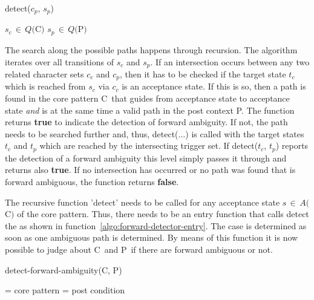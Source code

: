 \documentclass[acmtoplas]{acmtrans2m}
\newcommand{\funcref}[1]{function~\ref{algo:#1}}
\newcommand{\pP}{{\sf P}}
\newcommand{\pC}{{\sf C}}
\begin{document}
\begin{algorithm}
\caption{detect($c_p$, $s_p$)}
\label{algo:forward-detector}
\begin{algorithmic}
    \REQUIRE $s_c\,\in\,Q($\pC$)$
    \REQUIRE $s_p\,\in\,Q($\pP$)$
    
                \IF{ $t_c \,\in\,A($\pC$)$}
                    \RETURN \TRUE
                    \RETURN \TRUE
                \ENDIF
            \ENDIF
        \ENDFOR
    \ENDFOR
    \RETURN \FALSE
\end{algorithmic}
\end{algorithm}

The search along the possible paths happens through recursion.  The algorithm
    iterates over all transitions of $s_c$ and $s_p$.
    If an intersection occurs between any two related character sets $c_c$ and $c_p$, then it has to be
    checked if the target state $t_c$ which is reached from $s_c$ via $c_c$ is an acceptance
    state. If this is so, then a path is found in the core pattern \pC\ that guides from 
    acceptance state to acceptance state {\it and} is at the same time a valid
    path in the post context \pP. The function returns {\bf true} to indicate the
    detection of forward ambiguity. If not, the path needs to be searched
    further and, thus, detect($\ldots$) is called with the target states 
        $t_c$ and $t_p$ which are reached by the intersecting trigger
        set. If detect($t_c$, $t_p$) reports the detection of a forward ambiguity
        this level simply passes it through and returns also {\bf true}. If no
        intersection has occurred or no path was found that is forward
        ambiguous, the function returns {\bf false}.  
        
The recursive  function 'detect' needs to be called for any acceptance state
$s\,\in\,A($\pC$)$ of the core pattern. Thus, there needs to be an entry
function that calls detect the as shown in
\funcref{forward-detector-entry}.  The case is determined as soon as one
ambiguous path is determined. By means of this function it is now possible to
judge about \pC\ and \pP\ if there are forward ambiguous or not.

\begin{algorithm}
\caption{detect-forward-ambiguity(\pC, \pP)}
\label{algo:forward-detector-entry}
\begin{algorithmic}
    \REQUIRE \pC = core pattern
    \REQUIRE \pP = post condition
    
    \FOR{each $s_a\,\in\,A($\pC$)$}
        \IF{ detect($s_a,\, s_0($\pP$)$) = \TRUE}
             \RETURN \TRUE
        \ENDIF
    \ENDFOR
    \RETURN \FALSE
\end{algorithmic}
\end{algorithm}
\end{document}
